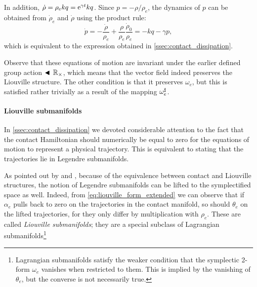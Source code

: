 In addition, \(\dot{\rho} = \rho_e kq = \mathrm{e}^{\gamma t} kq\). Since \(p = -\rho/\rho_e\), the dynamics of \(p\) can be obtained from  \(\dot{\rho}_e\) and \(\dot{\rho}\) using the product rule:
\begin{equation} 
    \dot{p} = -\frac{\dot{\rho}}{\rho_e} + \frac{\rho}{\rho_e}\frac{\dot{\rho}_0}{\rho_e} = -kq - \gamma p,
    \label{eq:pdot}
\end{equation}
which is equivalent to the expression obtained in \cref{ssec:contact_dissipation}.

Observe that these equations of motion are invariant under the earlier defined group action \(\blacktriangleleft\,\mathbb{R}_{\times}\), which means that the vector field indeed preserves the Liouville structure. The other condition is that it preserves \(\omega_e\), but this is satisfied rather trivially as a result of the mapping \(\omega_e^\sharp\).

\paragraph{Liouville submanifolds} In \cref{ssec:contact_dissipation} we devoted considerable attention to the fact that the contact Hamiltonian should numerically be equal to zero for the equations of motion to represent a physical trajectory. This is equivalent to stating that the trajectories lie in Legendre submanifolds.

As pointed out by \citet{VanderSchaft2021a} and \citet{Libermann1987}, because of the equivalence between contact and Liouville structures, the notion of Legendre submanifolds can be lifted to the symplectified space as well. Indeed, from \cref{eq:liouville_form_extended} we can observe that if \(\alpha_e\) pulls back to zero on the trajectories in the contact manifold, so should \(\theta_e\) on the lifted trajectories, for they only differ by multiplication with \(\rho_e\). These are called \emph{Liouville submanifolds}; they are a special subclass of Lagrangian submanifolds\footnote{Lagrangian submanifolds satisfy the weaker condition that the symplectic 2-form \(\omega_e\) vanishes when restricted to them. This is implied by the vanishing of \(\theta_e\), but the converse is not necessarily true.}

